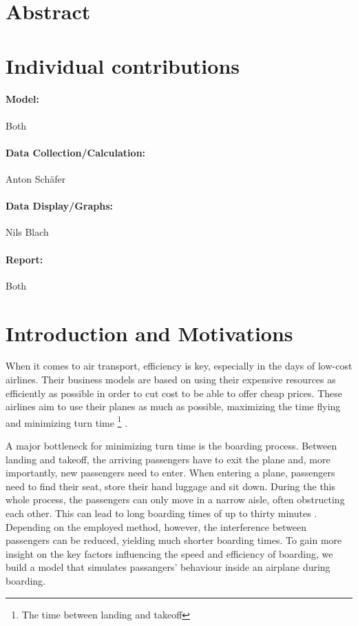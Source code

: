\documentclass[11pt]{article}
\begin{document}
\section{Abstract}

\section{Individual contributions}



\paragraph{Model:} Both
\paragraph{Data Collection/Calculation:} Anton Sch{\"a}fer
\paragraph{Data Display/Graphs:} Nils Blach
\paragraph{Report:} Both

\section{Introduction and Motivations}
When it comes to air transport, efficiency is key, especially in the days of low-cost airlines. Their business models are based on using their expensive resources as efficiently as possible in order to cut cost to be able to offer cheap prices. These airlines aim to use their planes as much as possible, maximizing the time flying and minimizing turn time \footnote{The time between landing and takeoff} \cite{barrett}.

A major bottleneck for minimizing turn time is the boarding process. Between landing and takeoff, the arriving passengers have to exit the plane and, more importantly, new passengers need to enter. When entering a plane, passengers need to find their seat, store their hand luggage and sit down. During the this whole process, the passengers can only move in a narrow aisle, often obstructing each other. This can lead to long boarding times of up to thirty minutes \cite{beus}. Depending on the employed method, however, the interference between passengers can be reduced, yielding much shorter boarding times. To gain more insight on the key factors influencing the speed and efficiency of boarding, we build a model that simulates passangers' behaviour inside an airplane during boarding.
\end{document}
